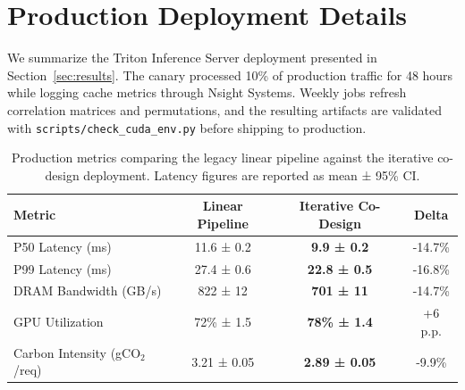 \documentclass{article}
\begin{document}
\section{Production Deployment Details}
\label{app:deployment}
We summarize the Triton Inference Server deployment presented in Section~\ref{sec:results}. The canary processed 10\% of production traffic for 48 hours while logging cache metrics through Nsight Systems. Weekly jobs refresh correlation matrices and permutations, and the resulting artifacts are validated with \texttt{scripts/check\_cuda\_env.py} before shipping to production.

\begin{table}[hbt!]
    \centering
    \caption{Production metrics comparing the legacy linear pipeline against the iterative co-design deployment. Latency figures are reported as mean ± 95\% CI.}
    \label{tab:production_metrics}
    \begin{tabular}{l c c c}
        \toprule
        \textbf{Metric} & \textbf{Linear Pipeline} & \textbf{Iterative Co-Design} & \textbf{Delta} \\
        \midrule
        P50 Latency (ms) & 11.6 ± 0.2 & \textbf{9.9 ± 0.2} & -14.7\% \\
        P99 Latency (ms) & 27.4 ± 0.6 & \textbf{22.8 ± 0.5} & -16.8\% \\
        DRAM Bandwidth (GB/s) & 822 ± 12 & \textbf{701 ± 11} & -14.7\% \\
        GPU Utilization & 72\% ± 1.5 & \textbf{78\% ± 1.4} & +6 p.p. \\
        Carbon Intensity (gCO$_2$/req) & 3.21 ± 0.05 & \textbf{2.89 ± 0.05} & -9.9\% \\
        \bottomrule
    \end{tabular}
\end{table}



\end{document}
